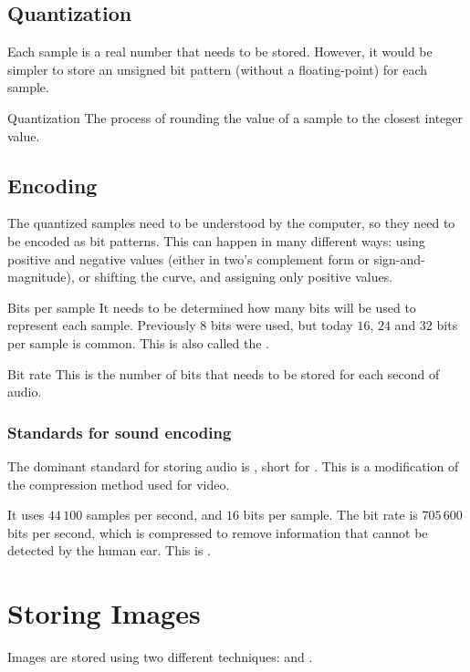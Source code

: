\documentclass[../notes.tex]{subfiles}
\begin{document}
			\subsection{Quantization}
				Each sample is a real number that needs to be stored. However, it would be simpler to store an unsigned bit pattern (without a floating-point) for each sample.
				\begin{definition}{Quantization}
					The process of rounding the value of a sample to the closest integer value.
				\end{definition}
			\subsection{Encoding}
				The quantized samples need to be understood by the computer, so they need to be encoded as bit patterns. This can happen in many different ways: using positive and negative values (either in two's complement form or sign-and-magnitude), or shifting the curve, and assigning only positive values.
				\begin{definition}{Bits per sample}
					It needs to be determined how many bits will be used to represent each sample. Previously $8$ bits were used, but today $16$, $24$ and $32$ bits per sample is common. This is also called the .
				\end{definition}
				\begin{definition}{Bit rate}
					This is the number of bits that needs to be stored for each second of audio.
				\end{definition}
				\subsubsection{Standards for sound encoding}
					The dominant standard for storing audio is , short for . This is a modification of the  compression method used for video.
					\begin{indentparagraph}
						It uses $44 \, 100$ samples per second, and $16$ bits per sample. The bit rate is $705 \, 600$ bits per second, which is compressed to remove information that cannot be detected by the human ear. This is .
					\end{indentparagraph}
		\section{Storing Images}
			Images are stored using two different techniques:  and .
\end{document}
